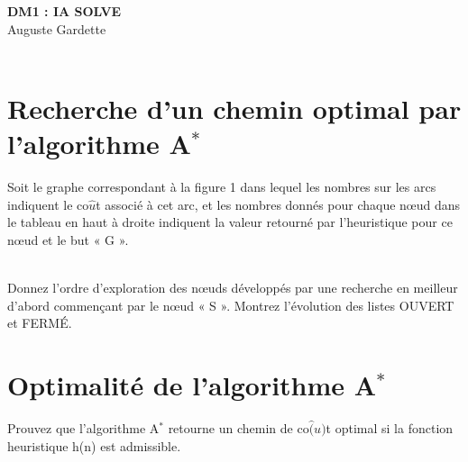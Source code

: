 \documentclass[12pt,a4paper, france]{article}
\newcommand\tab[1][1cm]{\hspace*{#1}}
\begin{document}
\begin{center}
{\textbf {\huge DM1 : IA SOLVE}}\\[5mm]
{\large Auguste Gardette} \\[5mm]
{} \\ [5mm]
\end{center}


\section{Recherche d’un chemin optimal par l’algorithme A${^*}$}

Soit le graphe correspondant \`a la figure 1 dans lequel les nombres sur les arcs indiquent le co${\hat{u}}$t
associ\'e \`a cet arc, et les nombres donn\'es pour chaque nœud dans le tableau en haut \`a droite
indiquent la valeur retourn\'e par l\textquoteright heuristique pour ce nœud et le but « G ». \\

 \\ [5mm]

Donnez l\textquoteright ordre d\textquoteright exploration des nœuds d\'evelopp\'es par une recherche en meilleur d\textquoteright abord commençant par le nœud  « S ». Montrez l\textquoteright \'evolution des listes OUVERT et FERM\'E. \\

\section{Optimalit\'e de l\textquoteright algorithme A${^*}$}

Prouvez que l\textquoteright algorithme A${^*}$ retourne un chemin de co${\hat(u)}$t optimal si la fonction heuristique h(n) est admissible. \\
\end{document}
